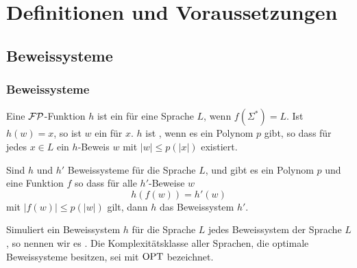 \section{Definitionen und Voraussetzungen} 
\subsection{Beweissysteme}

\begin{frame}
  \frametitle{Beweissysteme}
  
   Eine \(\mathcal{FP}\)-Funktion \(h\) ist ein  für eine Sprache \(L\), wenn \(f(\Sigma^*) = L\). 
   Ist \(h(w) = x\), so ist \(w\) ein  für \(x\). 
   \(h\) ist , wenn es ein Polynom \(p\) gibt, so dass für jedes \(x \in L\) ein \(h\)-Beweis \(w\) mit \(|w| \leq p(|x|)\) existiert. 
  
   Sind \(h\) und \(h'\) Beweissysteme für die Sprache \(L\), 
   und gibt es ein Polynom \(p\) und eine Funktion \(f\) 
   so dass für alle \(h'\)-Beweise \(w\) \[ h(f(w)) = h'(w) \] 
   mit \(|f(w)| \leq p(|w|)\) gilt, 
   dann  \(h\) das Beweissystem \(h'\). 
  
   Simuliert ein Beweissystem \(h\) für die Sprache \(L\) jedes Beweissystem der Sprache \(L\), so nennen wir es . 
   Die Komplexitätsklasse aller Sprachen, die optimale Beweissysteme besitzen, sei mit \(\text{OPT}\) bezeichnet.
\end{frame}

